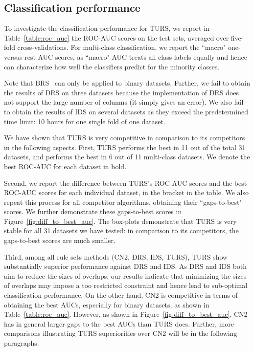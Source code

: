 \subsection{Classification performance} \label{subsec:classifier_perf}
To investigate the classification performance for TURS, we report  in Table~\ref{table:roc_auc} the ROC-AUC scores on the test sets, averaged over five-fold cross-validations. For multi-class classification, we report the ``macro" one-versus-rest AUC scores, as ``macro" AUC treats all class labels equally and hence can characterize how well the classifiers predict for the minority classes. 

Note that BRS~\citep{wang2017bayesian} can only be applied to binary datasets. Further, we fail to obtain the results of DRS on three datasets because the implementation of DRS does not support the large number of columns (it simply gives an error). We also fail to obtain the results of IDS on several datasets as they exceed the predetermined time limit: 10 hours for one single fold of one dataset. 

We have shown that TURS is very competitive in comparison to its competitors in the following aspects. First, TURS performs the best in 11 out of the total 31 datasets, and performs the best in 6 out of 11 multi-class datasets. We denote the best ROC-AUC for each dataset in bold. 

Second, we report the difference between TURS's ROC-AUC scores and the best ROC-AUC scores for each individual dataset, in the bracket in the table. We also repeat this process for all competitor algorithms, obtaining their ``gaps-to-best" scores. We further demonstrate these gaps-to-best scores in Figure~\ref{fig:diff_to_best_auc}. The box-plots demonstrate that TURS is very stable for all 31 datasets we have tested: in comparison to its competitors, the gaps-to-best scores are much smaller. 

Third, among all rule sets methods (CN2, DRS, IDS, TURS), TURS show substantially superior performance against DRS and IDS. As DRS and IDS both aim to reduce the sizes of overlaps, our results indicate that minimizing the sizes of overlaps may impose a too restricted constraint and hence lead to sub-optimal classification performance. On the other hand, CN2 is competitive in terms of obtaining the best AUCs, especially for binary datasets, as shown in Table~\ref{table:roc_auc}. However,  as shown in Figure~\ref{fig:diff_to_best_auc}, CN2 has in general larger gaps to the best AUCs than TURS does. Further, more comparisons illustrating TURS superiorities over CN2 will be in the following paragraphs. 

